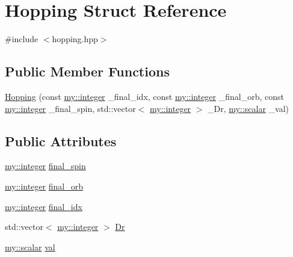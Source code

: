 \hypertarget{structHopping}{\section{Hopping Struct Reference}
\label{structHopping}
}


{\ttfamily \#include $<$hopping.\+hpp$>$}

\subsection*{Public Member Functions}
\begin{DoxyCompactItemize}
\item 
\hyperlink{structHopping_a91f81dd0337bbe39e566ddfbd8bda2cb}{Hopping} (const \hyperlink{namespacemy_a42365393c537edae1e89d20ff90d1923}{my\+::integer} \+\_\+final\+\_\+idx, const \hyperlink{namespacemy_a42365393c537edae1e89d20ff90d1923}{my\+::integer} \+\_\+final\+\_\+orb, const \hyperlink{namespacemy_a42365393c537edae1e89d20ff90d1923}{my\+::integer} \+\_\+final\+\_\+spin, std\+::vector$<$ \hyperlink{namespacemy_a42365393c537edae1e89d20ff90d1923}{my\+::integer} $>$ \+\_\+\+Dr, \hyperlink{namespacemy_a12d9dde7e2fb58fbd11051705c382a86}{my\+::scalar} \+\_\+val)
\end{DoxyCompactItemize}
\subsection*{Public Attributes}
\begin{DoxyCompactItemize}
\item 
\hyperlink{namespacemy_a42365393c537edae1e89d20ff90d1923}{my\+::integer} \hyperlink{structHopping_a5cc2d510da7ee8507e4a65f1fb72ddca}{final\+\_\+spin}
\item 
\hyperlink{namespacemy_a42365393c537edae1e89d20ff90d1923}{my\+::integer} \hyperlink{structHopping_ad1166a9ebbb8c6a1162730849bf4a5e1}{final\+\_\+orb}
\item 
\hyperlink{namespacemy_a42365393c537edae1e89d20ff90d1923}{my\+::integer} \hyperlink{structHopping_a1b55db9de9a4db775f0c2b657298a09d}{final\+\_\+idx}
\item 
std\+::vector$<$ \hyperlink{namespacemy_a42365393c537edae1e89d20ff90d1923}{my\+::integer} $>$ \hyperlink{structHopping_a2f0da903b2ac12160e7cf1d3c0e35e06}{Dr}
\item 
\hyperlink{namespacemy_a12d9dde7e2fb58fbd11051705c382a86}{my\+::scalar} \hyperlink{structHopping_a90017ad9f5dbd382ae1d84b5981dd93a}{val}
\end{DoxyCompactItemize}


